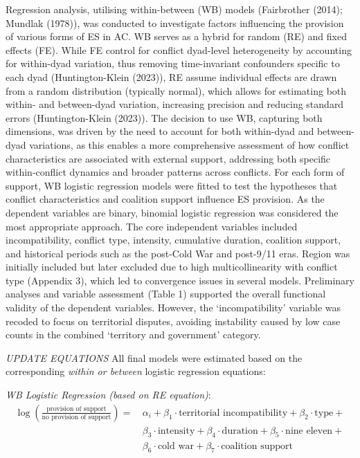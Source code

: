 \documentclass[
]{article}
\begin{document}
Regression analysis, utilising within-between (WB) models (Fairbrother
(2014); Mundlak (1978)), was conducted to investigate factors
influencing the provision of various forms of ES in AC. WB serves as a
hybrid for random (RE) and fixed effects (FE). While FE control for
conflict dyad-level heterogeneity by accounting for within-dyad
variation, thus removing time-invariant confounders specific to each
dyad (Huntington-Klein (2023)), RE assume individual effects are drawn
from a random distribution (typically normal), which allows for
estimating both within- and between-dyad variation, increasing precision
and reducing standard errors (Huntington-Klein (2023)). The decision to
use WB, capturing both dimensions, was driven by the need to account for
both within-dyad and between-dyad variations, as this enables a more
comprehensive assessment of how conflict characteristics are associated
with external support, addressing both specific within-conflict dynamics
and broader patterns across conflicts. For each form of support, WB
logistic regression models were fitted to test the hypotheses that
conflict characteristics and coalition support influence ES provision.
As the dependent variables are binary, binomial logistic regression was
considered the most appropriate approach. The core independent variables
included incompatibility, conflict type, intensity, cumulative duration,
coalition support, and historical periods such as the post-Cold War and
post-9/11 eras. Region was initially included but later excluded due to
high multicollinearity with conflict type (Appendix 3), which led to
convergence issues in several models. Preliminary analyses and variable
assessment (Table 1) supported the overall functional validity of the
dependent variables. However, the `incompatibility' variable was recoded
to focus on territorial disputes, avoiding instability caused by low
case counts in the combined `territory and government' category.

\emph{UPDATE EQUATIONS} All final models were estimated based on the
corresponding \emph{within or between} logistic regression equations:

\emph{WB Logistic Regression (based on RE equation)}: \[
\begin{aligned}
\log \left( \frac{\text{provision of support}}{\text{no provision of support}} \right) =\,
&\alpha_i + 
\beta_1 \cdot \text{territorial incompatibility} + 
\beta_2 \cdot \text{type} + \\
&\beta_3 \cdot \text{intensity} + 
\beta_4 \cdot \text{duration} + 
\beta_5 \cdot \text{nine eleven} + \\
&\beta_6 \cdot \text{cold war} + 
\beta_7 \cdot \text{coalition support}
\end{aligned}
\]
\end{document}
